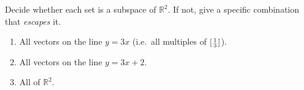 \documentclass[10pt]{article}
\begin{document}
\begin{practicebox}
Decide whether each set is a subspace of $\mathbb{R}^2$. If not, give a specific combination that
\emph{escapes} it.
\begin{enumerate}[leftmargin=1.6em, itemsep=4pt]
  \item All vectors on the line $y=3x$ (i.e.\ all multiples of $\begin{bsmallmatrix} 1\\3 \end{bsmallmatrix}$). \writeline
  \item All vectors on the line $y=3x+2$. \writeline
  \item All of $\mathbb{R}^2$. \writeline
\end{enumerate}
\end{practicebox}
\end{document}
